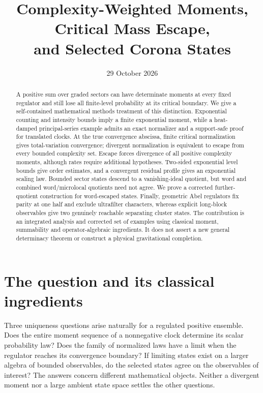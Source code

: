 \documentclass[11pt]{article}
\title{\textbf{Complexity-Weighted Moments, Critical Mass Escape,\\
and Selected Corona States}}
\author{}
\date{29 October 2026}
\theoremstyle{definition}
\begin{document}
\maketitle
\begin{abstract}
A positive sum over graded sectors can have determinate moments at every fixed regulator and still lose all finite-level probability at its critical boundary.
We give a self-contained mathematical methods treatment of this distinction.
Exponential counting and intensity bounds imply a finite exponential moment, while a heat-damped principal-series example admits an exact normalizer and a support-safe proof for translated clocks.
At the true convergence abscissa, finite critical normalization gives total-variation convergence; divergent normalization is equivalent to escape from every bounded complexity set.
Escape forces divergence of all positive complexity moments, although rates require additional hypotheses.
Two-sided exponential level bounds give order estimates, and a convergent residual profile gives an exponential scaling law.
Bounded sector states descend to a vanishing-ideal quotient, but word and combined word/microlocal quotients need not agree.
We prove a corrected further-quotient construction for word-escaped states.
Finally, geometric Abel regulators fix parity at one half and exclude ultrafilter characters, whereas explicit long-block observables give two genuinely reachable separating cluster states.
The contribution is an integrated analysis and corrected set of examples using classical moment, summability and operator-algebraic ingredients.
It does not assert a new general determinacy theorem or construct a physical gravitational completion.
\end{abstract}

\section{The question and its classical ingredients}

Three uniqueness questions arise naturally for a regulated positive ensemble.
Does the entire moment sequence of a nonnegative clock determine its scalar probability law?
Does the family of normalized laws have a limit when the regulator reaches its convergence boundary?
If limiting states exist on a larger algebra of bounded observables, do the selected states agree on the observables of interest?
The answers concern different mathematical objects.
Neither a divergent moment nor a large ambient state space settles the other questions.
\end{document}
